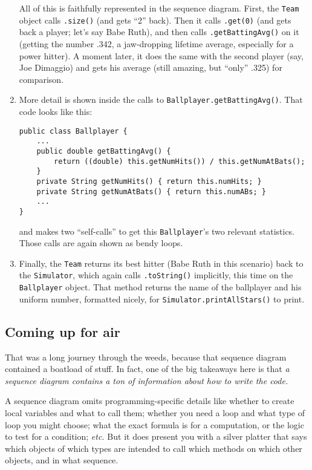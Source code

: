\begin{enumerate}
All of this is faithfully represented in the sequence diagram. First, the
\texttt{Team} object calls \texttt{.size()} (and gets ``2'' back). Then it
calls \texttt{.get(0)} (and gets back a player; let's say Babe Ruth), and then
calls \texttt{.getBattingAvg()} on it (getting the number .342, a jaw-dropping
lifetime average, especially for a power hitter). A moment later, it does the
same with the second player (say, Joe Dimaggio) and gets his average (still
amazing, but ``only'' .325) for comparison.

\item More detail is shown inside the calls to
\texttt{Ballplayer.getBattingAvg()}. That code looks like this:

\begin{Verbatim}[fontsize=\scriptsize,samepage=true,frame=single]
public class Ballplayer {
    ...
    public double getBattingAvg() {
        return ((double) this.getNumHits()) / this.getNumAtBats();
    }
    private String getNumHits() { return this.numHits; }
    private String getNumAtBats() { return this.numABs; }
    ...
}
\end{Verbatim}

and makes two ``self-calls'' to get this \texttt{Ballplayer}'s two relevant
statistics. Those calls are again shown as bendy loops.

\item Finally, the \texttt{Team} returns its best hitter (Babe Ruth in this
scenario) back to the \texttt{Simulator}, which again calls
\texttt{.toString()} implicitly, this time on the \texttt{Ballplayer} object.
That method returns the name of the ballplayer and his uniform number,
formatted nicely, for \texttt{Simulator.printAllStars()} to print.

\end{enumerate}

\subsection{Coming up for air}

That was a long journey through the weeds, because that sequence diagram
contained a boatload of stuff. In fact, one of the big takeaways here is that
\textit{a sequence diagram contains a ton of information about how to write
the code.}

A sequence diagram omits programming-specific details like whether to create
local variables and what to call them; whether you need a loop and what type
of loop you might choose; what the exact formula is for a computation, or the
logic to test for a condition; \textit{etc.} But it does present you with a
silver platter that says which objects of which types are intended to call
which methods on which other objects, and in what sequence.

